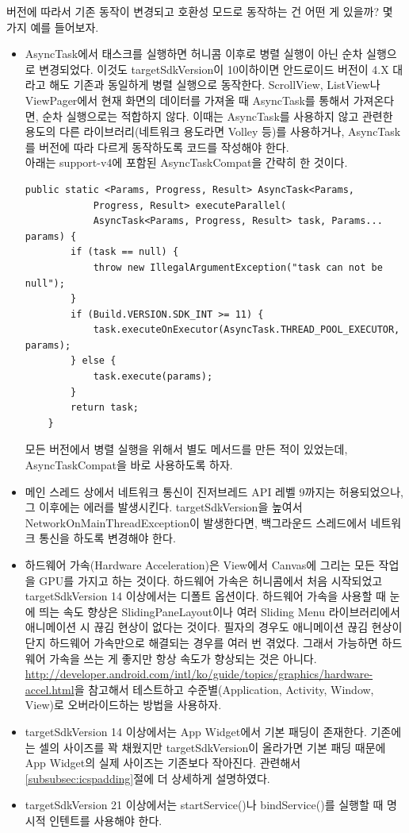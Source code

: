 버전에 따라서 기존 동작이 변경되고 호환성 모드로 동작하는 건 어떤 게 있을까? 몇 가지 예를 들어보자.
\begin{itemize}
\item AsyncTask에서 태스크를 실행하면 허니콤 이후로 병렬 실행이 아닌 순차 실행으로 변경되었다. 이것도 targetSdkVersion이 10이하이면 안드로이드 버전이 4.X 대라고 해도 기존과 동일하게 병렬 실행으로 동작한다. ScrollView, ListView나  ViewPager에서 현재 화면의 데이터를 가져올 때 AsyncTask를 통해서 가져온다면, 순차 실행으로는 적합하지 않다. 이때는  AsyncTask를 사용하지 않고 관련한 용도의 다른 라이브러리(네트워크 용도라면 Volley 등)를 사용하거나, AsyncTask를 버전에 따라 다르게 동작하도록 코드를 작성해야 한다.\\

아래는 support-v4에 포함된 AsyncTaskCompat을 간략히 한 것이다.
\begin{lstlisting}[frame=single]
	public static <Params, Progress, Result> AsyncTask<Params,
			Progress, Result> executeParallel(
            AsyncTask<Params, Progress, Result> task, Params... params) {
        if (task == null) {
            throw new IllegalArgumentException("task can not be null");
        }
        if (Build.VERSION.SDK_INT >= 11) {
            task.executeOnExecutor(AsyncTask.THREAD_POOL_EXECUTOR, params);
        } else {
            task.execute(params);
        }
        return task;
    }
\end{lstlisting}
모든 버전에서 병렬 실행을 위해서 별도 메서드를 만든 적이 있었는데, AsyncTaskCompat을 바로 사용하도록 하자.

\item 메인 스레드 상에서 네트워크 통신이 진저브레드 API 레벨 9까지는 허용되었으나, 그 이후에는 에러를 발생시킨다. targetSdkVersion을 높여서 NetworkOnMainThreadException이 발생한다면, 백그라운드 스레드에서 네트워크 통신을 하도록 변경해야 한다.
\item 하드웨어 가속(Hardware Acceleration)은 View에서 Canvas에 그리는 모든 작업을 GPU를 가지고 하는 것이다. 하드웨어 가속은 허니콤에서 처음 시작되었고 targetSdkVersion 14 이상에서는 디폴트 옵션이다. 하드웨어 가속을 사용할 때 눈에 띄는 속도 향상은 SlidingPaneLayout이나 여러 Sliding Menu 라이브러리에서 애니메이션 시 끊김 현상이 없다는 것이다. 
필자의 경우도 애니메이션 끊김 현상이 단지 하드웨어 가속만으로 해결되는 경우를 여러 번 겪었다.
그래서 가능하면 하드웨어 가속을 쓰는 게 좋지만 항상 속도가 향상되는 것은 아니다. \url{http://developer.android.com/intl/ko/guide/topics/graphics/hardware-accel.html}을 참고해서 테스트하고 수준별(Application, Activity, Window, View)로 오버라이드하는 방법을 사용하자.
\item targetSdkVersion 14 이상에서는 App Widget에서 기본 패딩이 존재한다. 기존에는 셀의 사이즈를 꽉 채웠지만 targetSdkVersion이 올라가면 기본 패딩 때문에 App Widget의 실제 사이즈는 기존보다 작아진다. 관련해서 \ref{subsubsec:icspadding}절에 더 상세하게 설명하였다.
\item targetSdkVersion 21 이상에서는 startService()나 bindService()를 실행할 때 명시적 인텐트를 사용해야 한다.
\end{itemize}

